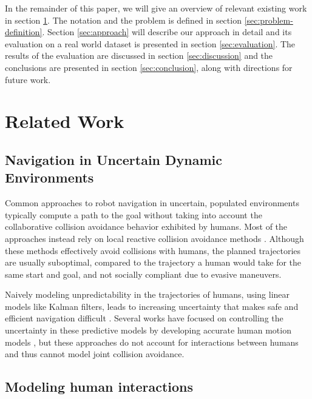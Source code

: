 In the remainder of this paper, we will give an overview of relevant
existing work in section \ref{sec:related-work}. The notation and the
problem is defined in section \ref{sec:problem-definition}. Section
\ref{sec:approach} will describe our approach in detail and its
evaluation on a real world dataset is presented in section
\ref{sec:evaluation}. The results of the evaluation are discussed in
section \ref{sec:discussion} and the conclusions are presented in
section \ref{sec:conclusion}, along with directions for future work.

\section{Related Work}
\label{sec:related-work}

\subsection{Navigation in Uncertain Dynamic Environments}
\label{sec:navig-dynam-envir}
Common approaches to robot navigation in uncertain, populated environments typically compute a path to the goal without taking into account the collaborative collision avoidance behavior exhibited by humans. Most of the approaches instead rely on local reactive collision avoidance methods \cite{philippsen2003smooth, thrun99}. Although these methods effectively avoid collisions with humans, the planned trajectories are usually suboptimal, compared to the trajectory a human would take for the same start and goal, and not socially compliant due to evasive maneuvers.

Naively modeling unpredictability in the trajectories of humans, using linear models like Kalman filters, leads to increasing uncertainty that makes safe and efficient navigation difficult \cite{trautman10}. Several works have focused on controlling the uncertainty in these predictive models by developing accurate human motion models \cite{thompson09, bennewitz05}, but these approaches do not account for interactions between humans and thus cannot model joint collision avoidance. 

\subsection{Modeling human interactions}
\label{sec:inter-betw-humans}

